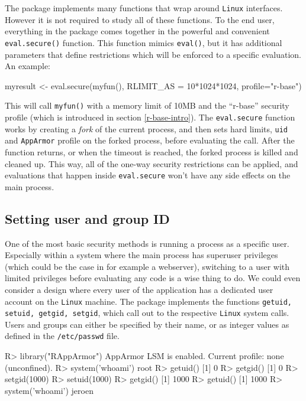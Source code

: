 \documentclass{jss}
\newcommand{\AppArmor}{\texttt{AppArmor}\xspace}
\newcommand{\RAppArmor}{\pkg{RAppArmor}\xspace}
\newcommand{\Linux}{\texttt{Linux}\xspace}
\begin{document}
The package implements many functions that wrap around \Linux {}
interfaces. However it is not required to study all of these functions. To the
end user, everything in the package comes together in the powerful and
convenient \texttt{eval.secure()} function. This function mimics
\texttt{eval()}, but it has additional parameters that define restrictions
which will be enforced to a specific evaluation. An example:

\begin{CodeChunk}
\begin{CodeInput}
myresult <- eval.secure(myfun(), RLIMIT_AS = 10*1024*1024, profile="r-base")
\end{CodeInput}
\end{CodeChunk}

This will call \texttt{myfun()} with a memory limit of 10MB and the ``r-base''
security profile (which is introduced in section \ref{r-base-intro}). The
\texttt{eval.secure} function works by creating a \emph{fork} of the current
process, and then sets hard limits, \texttt{uid} and \AppArmor profile on the
forked process, before evaluating the call. After the function returns, or when
the timeout is reached, the forked process is killed and cleaned up. This way,
all of the one-way security restrictions can be applied, and evaluations that
happen inside \texttt{eval.secure} won't have any side effects on the main
process.

\subsection{Setting user and group ID}

One of the most basic security methods is running a process as a specific user.
Especially within a system where the main process has superuser privileges
(which could be the case in for example a webserver), switching to a user with
limited privileges before evaluating any code is a wise thing to do. We could
even consider a design where every user of the application has a dedicated
user account on the \Linux machine. The \RAppArmor package implements the
functions \texttt{getuid, setuid, getgid, setgid}, which call out to the
respective \Linux system calls. Users and groups can either be specified
by their name, or as integer values as defined in the \texttt{/etc/passwd} file.

\begin{CodeChunk}
\begin{CodeInput}
R> library("RAppArmor")
AppArmor LSM is enabled.
Current profile: none (unconfined).
R> system('whoami')
root
R> getuid()
[1] 0
R> getgid()
[1] 0
R> setgid(1000)
R> setuid(1000)
R> getgid()
[1] 1000
R> getuid()
[1] 1000
R> system('whoami')
jeroen
\end{CodeInput}
\end{CodeChunk}
\end{document}
